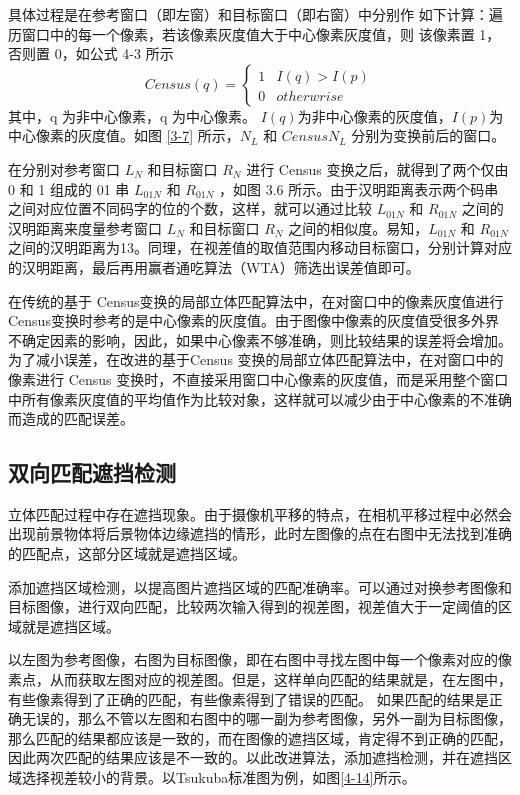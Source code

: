 具体过程是在参考窗口（即左窗）和目标窗口（即右窗）中分别作
如下计算：遍历窗口中的每一个像素，若该像素灰度值大于中心像素灰度值，则
该像素置 1，否则置 0，如公式 4-3 所示
\begin{equation}
Census(q)=\left\{\begin{matrix}
1 & I(q)>I(p) \\ 
0 & otherwrise 
\end{matrix}\right.
\end{equation}
其中，q 为非中心像素，q 为中心像素。 $I(q)$为非中心像素的灰度值，$ I(p)$为
中心像素的灰度值。如图 \ref{3-7} 所示，$N_{L}$ 和 $CensusN_{L}$ 分别为变换前后的窗口。

在分别对参考窗口 $L_{N}$ 和目标窗口 $R_{N}$ 进行 Census 变换之后，就得到了两个仅由 0 和 1 组成的 01 串 $L_{01N}$ 和 $R_{01N}$ ，如图 3.6 所示。由于汉明距离表示两个码串之间对应位置不同码字的位的个数，这样，就可以通过比较 $L_{01N}$ 和 $R_{01N}$ 之间的汉明距离来度量参考窗口 $L_{N}$ 和目标窗口 $R_{N}$ 之间的相似度。易知，$L_{01N}$ 和 $R_{01N}$ 之间的汉明距离为13。同理，在视差值的取值范围内移动目标窗口，分别计算对应的汉明距离，最后再用赢者通吃算法（WTA）筛选出误差值即可。

在传统的基于 Census变换的局部立体匹配算法中，在对窗口中的像素灰度值进行 Census变换时参考的是中心像素的灰度值。由于图像中像素的灰度值受很多外界不确定因素的影响，因此，如果中心像素不够准确，则比较结果的误差将会增加。为了减小误差，在改进的基于Census 变换的局部立体匹配算法中，在对窗口中的像素进行 Census 变换时，不直接采用窗口中心像素的灰度值，而是采用整个窗口中所有像素灰度值的平均值作为比较对象，这样就可以减少由于中心像素的不准确而造成的匹配误差。 

\subsection{双向匹配遮挡检测}

立体匹配过程中存在遮挡现象。由于摄像机平移的特点，在相机平移过程中必然会出现前景物体将后景物体边缘遮挡的情形，此时左图像的点在右图中无法找到准确的匹配点，这部分区域就是遮挡区域。


添加遮挡区域检测，以提高图片遮挡区域的匹配准确率。可以通过对换参考图像和目标图像，进行双向匹配，比较两次输入得到的视差图，视差值大于一定阈值的区域就是遮挡区域。

以左图为参考图像，右图为目标图像，即在右图中寻找左图中每一个像素对应的像素点，从而获取左图对应的视差图。但是，这样单向匹配的结果就是，在左图中，有些像素得到了正确的匹配，有些像素得到了错误的匹配。 如果匹配的结果是正确无误的，那么不管以左图和右图中的哪一副为参考图像，另外一副为目标图像，那么匹配的结果都应该是一致的，而在图像的遮挡区域，肯定得不到正确的匹配，因此两次匹配的结果应该是不一致的。以此改进算法，添加遮挡检测，并在遮挡区域选择视差较小的背景。以Tsukuba标准图为例，如图\ref{4-14}所示。

